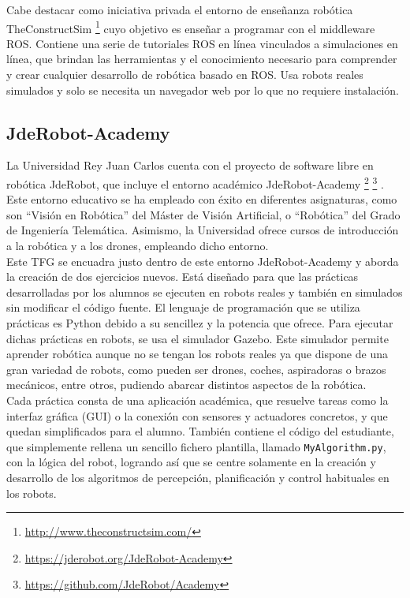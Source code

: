 Cabe destacar como iniciativa privada el entorno de enseñanza robótica TheConstructSim \footnote{\url{http://www.theconstructsim.com/}} cuyo objetivo es enseñar a programar con el middleware ROS.  Contiene una serie de tutoriales ROS en línea vinculados a simulaciones en línea, que brindan las herramientas y el conocimiento necesario para comprender y crear cualquier desarrollo de robótica basado en ROS. Usa robots reales simulados y solo se necesita un navegador web por lo que no requiere instalación.


\subsection{JdeRobot-Academy}
La Universidad Rey Juan Carlos cuenta con el proyecto de software libre en robótica JdeRobot, que incluye el entorno académico JdeRobot-Academy \footnote{\url{https://jderobot.org/JdeRobot-Academy}} \footnote{\url{https://github.com/JdeRobot/Academy}} . Este entorno educativo se ha empleado con éxito en diferentes asignaturas, como son ``Visión en Robótica'' del Máster de Visión Artificial, o ``Robótica'' del Grado de Ingeniería Telemática. Asimismo, la Universidad ofrece cursos de introducción a la robótica y a los drones, empleando dicho entorno. \\

Este TFG se encuadra justo dentro de este entorno JdeRobot-Academy y aborda la creación de dos ejercicios nuevos. Está diseñado para que las prácticas desarrolladas por los alumnos se ejecuten en robots reales y también en simulados sin modificar el código fuente. El lenguaje de programación que se utiliza prácticas es Python debido a su sencillez y la potencia que ofrece. Para ejecutar dichas prácticas en robots, se usa el simulador Gazebo. Este simulador permite aprender robótica aunque no se tengan los robots reales ya que dispone de una gran variedad de robots, como pueden ser drones, coches, aspiradoras o brazos mecánicos, entre otros, pudiendo abarcar distintos aspectos de la robótica. \\

Cada práctica consta de una aplicación académica, que resuelve tareas como la interfaz gráfica (GUI) o la conexión con sensores y actuadores concretos, y que quedan simplificados para el alumno. También contiene el código del estudiante, que simplemente rellena un sencillo fichero plantilla, llamado \texttt{MyAlgorithm.py}, con la lógica del robot, logrando así que se centre solamente en la creación y desarrollo de los algoritmos de percepción, planificación y control habituales en los robots. \\

